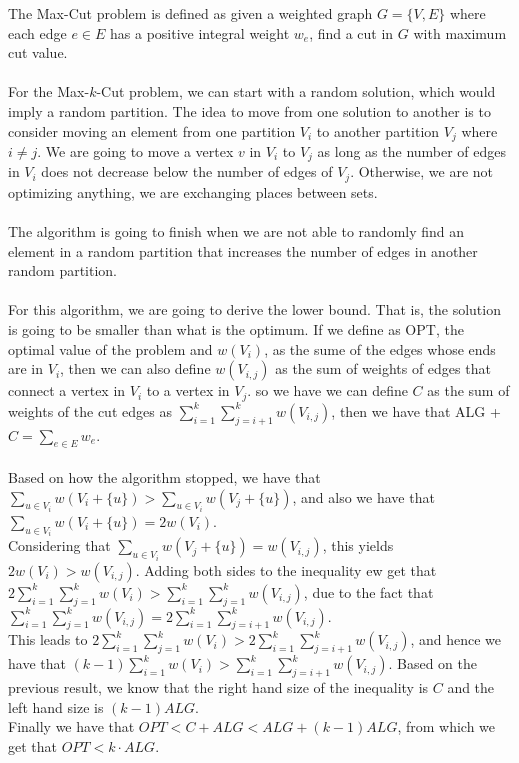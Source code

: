 \documentclass[tikz, 12pt]{scrartcl}
\begin{document}
\begin{enumerate}
The Max-Cut problem is defined as given a weighted graph $G = \{V, E\}$ where each edge $e \in E$ has a positive integral weight $w_e$, find a cut in $G$ with maximum cut value.\\
\\
For the Max-$k$-Cut problem, we can start with a random solution, which would imply a random partition. The idea to move from one solution to another is to consider moving an element from one partition $V_i$ to another partition $V_j$ where $i \neq j$. We are going to move a vertex $v$ in $V_i$ to $V_j$ as long as the number of edges in $V_i$ does not decrease below the number of edges of $V_j$. Otherwise, we are not optimizing anything, we are exchanging places between sets.\\
\\
The algorithm is going to finish when we are not able to randomly find an element in a random partition that increases the number of edges in another random partition.\\
\\
For this algorithm, we are going to derive the lower bound. That is, the solution is going to be smaller than what is the optimum. If we define as OPT, the optimal value of the problem and  $w(V_i)$, as the sume of the edges whose ends are in $V_i$, then we can also define $w(V_{i,j})$ as the sum of weights of edges that connect a vertex in $V_i$ to a vertex in $V_j$. so we have we can define $C$ as the sum of weights of the cut edges as $\sum_{i=1}^k \sum_{j = i + 1}^{k}w(V_{i,j})$, then we have that ALG + $C = \sum_{e \in E} w_e$.\\
\\
Based on how the algorithm stopped, we have that $\sum_{u \in V_i}w(V_{i} + \{u\}) > \sum_{u \in V_i}w(V_{j} + \{u\})$, and also we have that $\sum_{u \in V_i}w(V_i + \{u\}) = 2 w(V_i)$.\\
Considering that $\sum_{u \in V_i}w(V_j + \{u\}) = w(V_{i,j})$, this yields $2w(V_i) > w(V_{i,j})$. Adding both sides to the inequality ew get that $2 \sum_{i=1}^k \sum_{j = 1}^k w(V_i) >  \sum_{i=1}^k \sum_{j = 1}^k w(V_{i,j})$, due to the fact that   $\sum_{i=1}^k \sum_{j = 1}^k w(V_{i,j}) = 2 \sum_{i=1}^k \sum_{j = i+1}^k w(V_{i,j})$.\\
This leads to $2\sum_{i=1}^k \sum_{j = 1}^k w(V_{i}) > 2 \sum_{i=1}^k \sum_{j = i+1}^k w(V_{i,j})$, and hence we have that $(k -1) \sum_{i = 1}^k w(V_i) > \sum_{i = 1}^k \sum_{j = i +1}^k w(V_{i,j})$. Based on the previous result, we know that the right hand size of the inequality is $C$ and the left hand size is $(k - 1) ALG$. \\
Finally we have that $OPT < C + ALG < ALG + (k - 1)ALG$, from which we get that $OPT< k \cdot ALG$. 



\end{enumerate}
\end{document}
